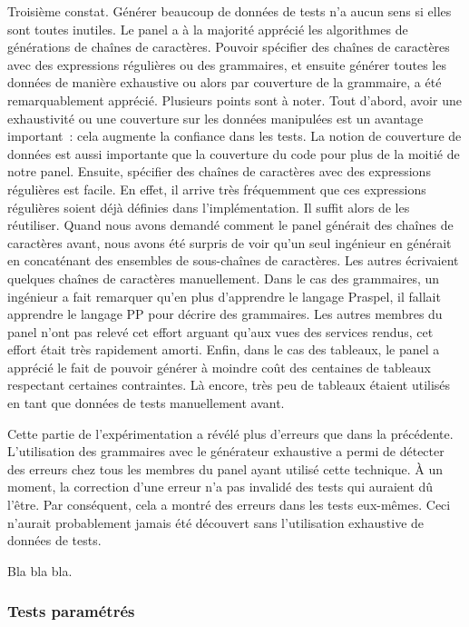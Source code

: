 Troisième constat. Générer beaucoup de données de tests n'a aucun sens si elles
sont toutes inutiles. Le panel a à la majorité apprécié les algorithmes de
générations de chaînes de caractères. Pouvoir spécifier des chaînes de
caractères avec des expressions régulières ou des grammaires, et ensuite générer
toutes les données de manière exhaustive ou alors par couverture de la
grammaire, a été remarquablement apprécié. Plusieurs points sont à noter. Tout
d'abord, avoir une exhaustivité ou une couverture sur les données manipulées est
un avantage important~: cela augmente la confiance dans les tests. La notion de
couverture de données est aussi importante que la couverture du code pour plus
de la moitié de notre panel. Ensuite, spécifier des chaînes de caractères avec
des expressions régulières est facile. En effet, il arrive très fréquemment que
ces expressions régulières soient déjà définies dans l'implémentation. Il suffit
alors de les réutiliser. Quand nous avons demandé comment le panel générait des
chaînes de caractères avant, nous avons été surpris de voir qu'un seul ingénieur
en générait en concaténant des ensembles de sous-chaînes de caractères. Les
autres écrivaient quelques chaînes de caractères manuellement. Dans le cas des
grammaires, un ingénieur a fait remarquer qu'en plus d'apprendre le langage
Praspel, il fallait apprendre le langage PP pour décrire des grammaires. Les
autres membres du panel n'ont pas relevé cet effort arguant qu'aux vues des
services rendus, cet effort était très rapidement amorti. Enfin, dans le cas des
tableaux, le panel a apprécié le fait de pouvoir générer à moindre coût des
centaines de tableaux respectant certaines contraintes. Là encore, très peu de
tableaux étaient utilisés en tant que données de tests manuellement avant.

Cette partie de l'expérimentation a révélé plus d'erreurs que dans la
précédente. L'utilisation des grammaires avec le générateur exhaustive a permi
de détecter des erreurs chez tous les membres du panel ayant utilisé cette
technique. À un moment, la correction d'une erreur n'a pas invalidé des tests
qui auraient dû l'être. Par conséquent, cela a montré des erreurs dans les tests
eux-mêmes. Ceci n'aurait probablement jamais été découvert sans l'utilisation
exhaustive de données de tests.

Bla bla bla.

\subsubsection{Tests paramétrés}

